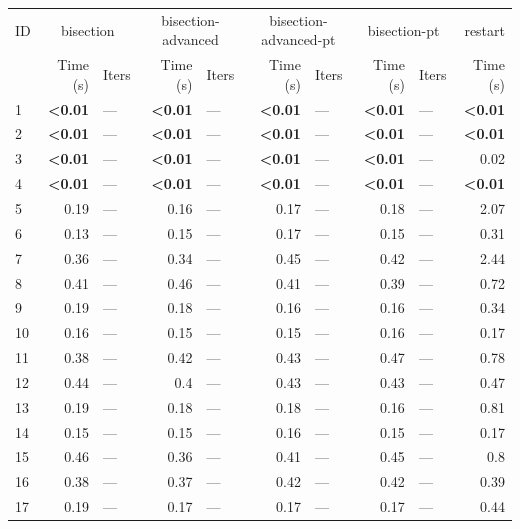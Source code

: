 \begin{longtable}{lr@{\hskip 4pt}l@{\hskip 12pt}r@{\hskip 4pt}l@{\hskip 12pt}r@{\hskip 4pt}l@{\hskip 12pt}r@{\hskip 4pt}l@{\hskip 12pt}r}
\toprule
ID & \multicolumn{2}{c}{bisection} & \multicolumn{2}{c}{bisection-advanced} & \multicolumn{2}{c}{bisection-advanced-pt} & \multicolumn{2}{c}{bisection-pt} & restart \\
\cmidrule(lr){2-3}\cmidrule(lr){4-5}\cmidrule(lr){6-7}\cmidrule(lr){8-9}\cmidrule(lr){10-10}
 & Time (s) &  Iters & Time (s) &  Iters & Time (s) &  Iters & Time (s) &  Iters & Time (s) \\
\midrule
\endhead
1 & \textbf{<0.01} & --- & \textbf{<0.01} & --- & \textbf{<0.01} & --- & \textbf{<0.01} & --- & \textbf{<0.01} \\
2 & \textbf{<0.01} & --- & \textbf{<0.01} & --- & \textbf{<0.01} & --- & \textbf{<0.01} & --- & \textbf{<0.01} \\
\cmidrule{2-10}
3 & \textbf{<0.01} & --- & \textbf{<0.01} & --- & \textbf{<0.01} & --- & \textbf{<0.01} & --- & 0.02 \\
4 & \textbf{<0.01} & --- & \textbf{<0.01} & --- & \textbf{<0.01} & --- & \textbf{<0.01} & --- & \textbf{<0.01} \\
\midrule
5 & 0.19 & --- & 0.16 & --- & 0.17 & --- & 0.18 & --- & 2.07 \\
6 & 0.13 & --- & 0.15 & --- & 0.17 & --- & 0.15 & --- & 0.31 \\
7 & 0.36 & --- & 0.34 & --- & 0.45 & --- & 0.42 & --- & 2.44 \\
8 & 0.41 & --- & 0.46 & --- & 0.41 & --- & 0.39 & --- & 0.72 \\
\cmidrule{2-10}
9 & 0.19 & --- & 0.18 & --- & 0.16 & --- & 0.16 & --- & 0.34 \\
10 & 0.16 & --- & 0.15 & --- & 0.15 & --- & 0.16 & --- & 0.17 \\
11 & 0.38 & --- & 0.42 & --- & 0.43 & --- & 0.47 & --- & 0.78 \\
12 & 0.44 & --- & 0.4 & --- & 0.43 & --- & 0.43 & --- & 0.47 \\
\cmidrule{2-10}
13 & 0.19 & --- & 0.18 & --- & 0.18 & --- & 0.16 & --- & 0.81 \\
14 & 0.15 & --- & 0.15 & --- & 0.16 & --- & 0.15 & --- & 0.17 \\
15 & 0.46 & --- & 0.36 & --- & 0.41 & --- & 0.45 & --- & 0.8 \\
16 & 0.38 & --- & 0.37 & --- & 0.42 & --- & 0.42 & --- & 0.39 \\
\cmidrule{2-10}
17 & 0.19 & --- & 0.17 & --- & 0.17 & --- & 0.17 & --- & 0.44 \\

\end{longtable}
